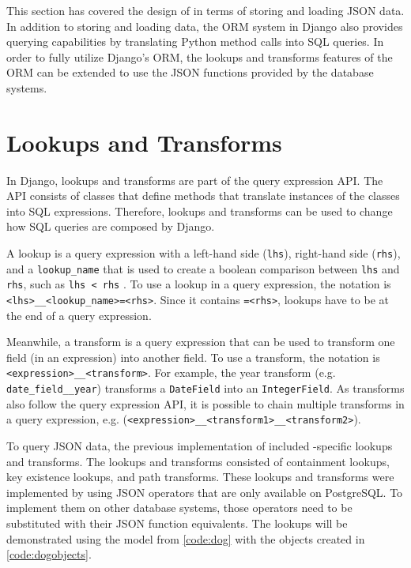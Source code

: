 This section has covered the design of  in terms of storing and
loading JSON data. In addition to storing and loading data, the ORM system in
Django also provides querying capabilities by translating Python method calls
into SQL  queries. In order to fully utilize Django's ORM, the
lookups and transforms features of the ORM can be extended to use the JSON
functions provided by the database systems.

\section{ Lookups and Transforms}

In Django, lookups and transforms are part of the query expression API. The
API consists of classes that define methods that translate instances of the
classes into SQL expressions. Therefore, lookups and transforms can be used to
change how SQL queries are composed by Django.

A lookup is a query expression with a left-hand side (\verb|lhs|), right-hand
side (\verb|rhs|), and a \verb|lookup_name| that is used to create a boolean
comparison between \verb|lhs| and \verb|rhs|, such as \verb|lhs < rhs|
\cite{django:lookups}. To use a lookup in a query expression, the notation is
\verb|<lhs>__<lookup_name>=<rhs>|. Since it contains \verb|=<rhs>|, lookups
have to be at the end of a query expression.

Meanwhile, a transform is a query expression that can be used to transform one
field (in an expression) into another field. To use a transform, the notation
is \verb|<expression>__<transform>|. For example, the year transform (e.g.
\verb|date_field__year|) transforms a \verb|DateField| into an
\verb|IntegerField|. As transforms also follow the query expression API, it is
possible to chain multiple transforms in a query expression, e.g.
(\verb|<expression>__<transform1>__<transform2>|).

To query JSON data, the previous implementation of  included
-specific lookups and transforms. The lookups and transforms
consisted of containment lookups, key existence lookups, and path transforms.
These lookups and transforms were implemented by using JSON operators that are
only available on PostgreSQL. To implement them on other database systems,
those operators need to be substituted with their JSON function equivalents.
The lookups will be demonstrated using the  model from
\autoref{code:dog} with the objects created in \autoref{code:dogobjects}.

